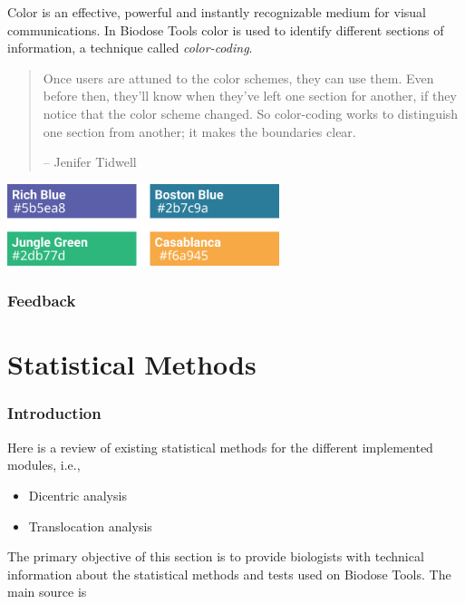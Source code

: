 \documentclass[]{scrartcl}
\providecommand{\tightlist}{%
  \setlength{\itemsep}{0pt}\setlength{\parskip}{0pt}}
\begin{document}
Color is an effective, powerful and instantly recognizable medium for visual communications. In Biodose Tools color is used to identify different sections of information, a technique called \emph{color-coding}.

\begin{quote}
Once users are attuned to the color schemes, they can use them. Even before then, they'll know when they've left one section for another, if they notice that the color scheme changed. So color-coding works to distinguish one section from another; it makes the boundaries clear.

-- Jenifer Tidwell \citep{Tidwel2010}
\end{quote}

\begin{center}\includegraphics[width=300px]{images/user-manual/color-coding} \end{center}

\hypertarget{feedback}{%
\section{Feedback}\label{feedback}}

\hypertarget{part-statistical-methods}{%
\part{Statistical Methods}\label{part-statistical-methods}}

\hypertarget{stats-intro}{%
\section{Introduction}\label{stats-intro}}

Here is a review of existing statistical methods for the different implemented modules, i.e.,

\begin{itemize}
\tightlist
\item
  Dicentric analysis
\item
  Translocation analysis
\end{itemize}

The primary objective of this section is to provide biologists with technical information about the statistical methods and tests used on Biodose Tools. The main source is \citep{IAEA2001}
\end{document}
